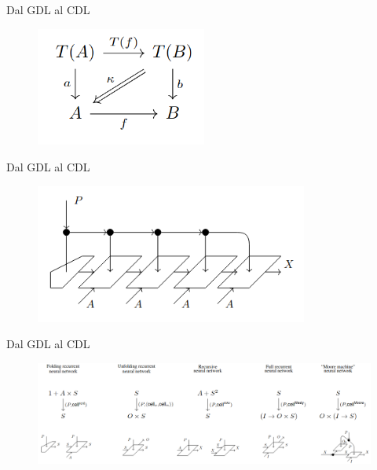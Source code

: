 \documentclass{beamer}
\begin{document}
\begin{frame}{Dal GDL al CDL}
    \begin{figure}
        \begin{center}
            \includegraphics[width=0.5\textwidth]{figures/lax_algebra_hom.png}
            \caption*{\cite{gavranovicposition}}
        \end{center}
    \end{figure}
\end{frame}

\begin{frame}{Dal GDL al CDL}
    \begin{figure}
        \begin{center}
            \includegraphics[width=0.8\textwidth]{figures/folding_rnn.png}
            \caption*{\cite{gavranovicposition}}
        \end{center}
    \end{figure}
\end{frame}

\begin{frame}{Dal GDL al CDL}
    \begin{figure}
        \begin{center}
            \includegraphics[width=1\textwidth]{figures/cells.png}
            \caption*{\cite{gavranovicposition}}
        \end{center}
    \end{figure}
\end{frame}
\end{document}
